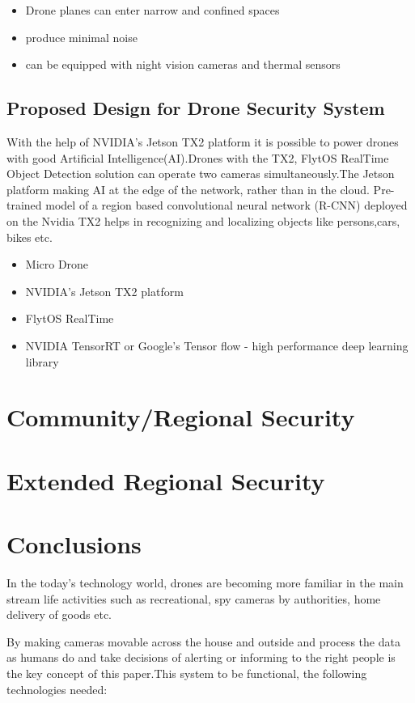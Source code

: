 \documentclass[sigconf]{acmart}
\begin{document}
\begin{itemize}
 \item Drone planes can enter narrow and confined spaces
 \item produce minimal noise
 \item  can be equipped with night vision cameras and thermal sensors
\end{itemize}
\subsection{Proposed Design for Drone Security System}
With the help of NVIDIA's Jetson TX2 platform it is possible to power drones with good Artificial Intelligence(AI).Drones with the TX2, FlytOS RealTime Object Detection solution can operate two cameras simultaneously.The Jetson platform making AI at the edge of the network, rather than in the cloud. Pre-trained model of a region  based convolutional neural network (R-CNN) deployed on the Nvidia  TX2  helps in recognizing and localizing objects like persons,cars, bikes etc.
  \begin{itemize}
    \item Micro Drone
    \item NVIDIA's Jetson TX2 platform 
    \item FlytOS RealTime
    \item NVIDIA TensorRT or Google's Tensor flow - high performance deep learning library
 \end{itemize}

\section{Community/Regional Security}

\section{Extended Regional Security}

\section{Conclusions}
In the today's technology world, drones are becoming more familiar in the main stream life activities such as recreational, spy cameras by authorities, home delivery of goods etc.

By making cameras movable across the house and outside and process the data as humans do and take decisions of alerting or informing to the right people is the key concept of this paper.This system to be functional, the following technologies needed:
\end{document}
